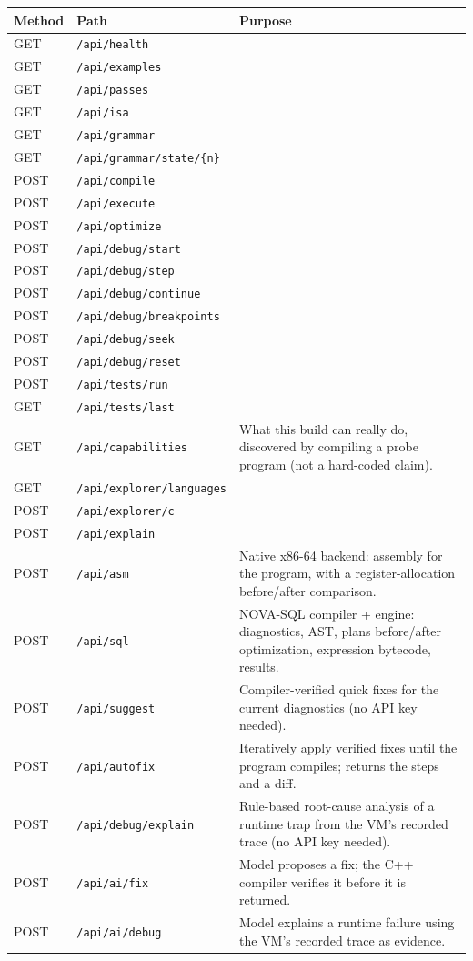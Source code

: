 \begin{longtable}{@{}llp{}@{}}\toprule
\textbf{Method} & \textbf{Path} & \textbf{Purpose}\\ \midrule\endhead
GET & \texttt{/api/health} & \\
GET & \texttt{/api/examples} & \\
GET & \texttt{/api/passes} & \\
GET & \texttt{/api/isa} & \\
GET & \texttt{/api/grammar} & \\
GET & \texttt{/api/grammar/state/\{n\}} & \\
POST & \texttt{/api/compile} & \\
POST & \texttt{/api/execute} & \\
POST & \texttt{/api/optimize} & \\
POST & \texttt{/api/debug/start} & \\
POST & \texttt{/api/debug/step} & \\
POST & \texttt{/api/debug/continue} & \\
POST & \texttt{/api/debug/breakpoints} & \\
POST & \texttt{/api/debug/seek} & \\
POST & \texttt{/api/debug/reset} & \\
POST & \texttt{/api/tests/run} & \\
GET & \texttt{/api/tests/last} & \\
GET & \texttt{/api/capabilities} & What this build can really do, discovered by compiling a probe program (not a hard-coded claim).\\
GET & \texttt{/api/explorer/languages} & \\
POST & \texttt{/api/explorer/c} & \\
POST & \texttt{/api/explain} & \\
POST & \texttt{/api/asm} & Native x86-64 backend: assembly for the program, with a register-allocation before/after comparison.\\
POST & \texttt{/api/sql} & NOVA-SQL compiler + engine: diagnostics, AST, plans before/after optimization, expression bytecode, results.\\
POST & \texttt{/api/suggest} & Compiler-verified quick fixes for the current diagnostics (no API key needed).\\
POST & \texttt{/api/autofix} & Iteratively apply verified fixes until the program compiles; returns the steps and a diff.\\
POST & \texttt{/api/debug/explain} & Rule-based root-cause analysis of a runtime trap from the VM's recorded trace (no API key needed).\\
POST & \texttt{/api/ai/fix} & Model proposes a fix; the C++ compiler verifies it before it is returned.\\
POST & \texttt{/api/ai/debug} & Model explains a runtime failure using the VM's recorded trace as evidence.\\
\bottomrule
\end{longtable}

